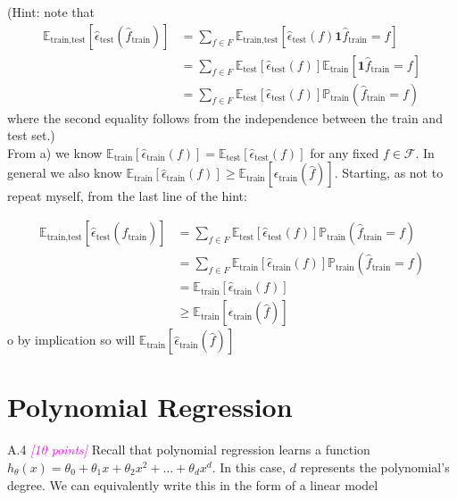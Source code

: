 \documentclass{article}
\newcommand{\1}{\mathbf{1}}
\newcommand{\E}{\mathbb{E}}
\renewcommand{\P}{\mathbb{P}}
\newcommand{\points}[1]{\small\textcolor{magenta}{\emph{[#1 points]}} \normalsize}
\begin{document}
\begin{enumerate}
    (Hint:  note that
    \begin{align*}
        \E_\text{train,test}[\widehat\epsilon_\text{test}(\hat f_\text{train})]
        &= \sum_{f \in F} \E_\text{train,test}[\widehat\epsilon_\text{test}(f)\1{\hat f_\text{train}=f}] \\
        &= \sum_{f \in F} \E_\text{test}[\widehat\epsilon_\text{test}(f)]\E_\text{train}[\1{\hat f_\text{train}=f}] \\ 
        &= \sum_{f \in F} \E_\text{test}[\widehat\epsilon_\text{test}(f)] \P_\text{train}(\hat f_\text{train}=f)
    \end{align*}
    where the second equality follows from the independence between the train and test set.) \\
    
    From a) we know $\E_\text{train}[\widehat\epsilon_\text{train}(f)] = \E_\text{test}[\widehat\epsilon_\text{test}(f)]$ for any fixed $f\in \mathcal{F}$. In general we also know $\E_\text{train}[\widehat\epsilon_\text{train}(f)] \geq \E_\text{train}[\epsilon_\text{train}(\hat f)]$. Starting, as not to repeat myself, from the last line of the hint:
    
    \begin{align*}
        \E_\text{train,test}[\widehat\epsilon_\text{test}(\hat f_\text{train})] &= \sum_{f \in F} \E_\text{test}[\widehat\epsilon_\text{test}(f)] \P_\text{train}(\hat f_\text{train}=f) \\
        &= \sum_{f \in F} \E_\text{train}[\widehat\epsilon_\text{train}(f)] \P_\text{train}(\hat f_\text{train}=f) \\
        &= \E_\text{train}[\widehat\epsilon_\text{train}(f)] \\
        &\geq \E_\text{train}[\epsilon_\text{train}(\hat f)]
    \end{align*}{}
    o by implication so will $\E_\text{train}[\widehat \epsilon_\text{train}(\hat f)]$
    \end{enumerate}

\newpage
\section*{Polynomial Regression}

A.4 \points{10} Recall that polynomial regression learns a function $h_\theta(x) =\theta_0 + \theta_1x + \theta_2x^2 + \hdots +\theta_dx^d$. In this case, $d$ represents the polynomial’s degree. We can equivalently write this in the form of a linear model
\end{document}
